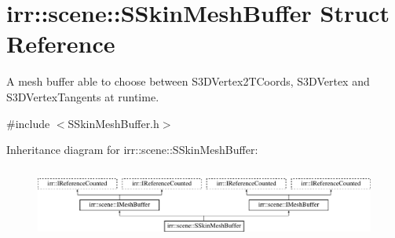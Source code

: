 \hypertarget{structirr_1_1scene_1_1SSkinMeshBuffer}{}\section{irr\+:\+:scene\+:\+:S\+Skin\+Mesh\+Buffer Struct Reference}
\label{structirr_1_1scene_1_1SSkinMeshBuffer}


A mesh buffer able to choose between S3\+D\+Vertex2\+T\+Coords, S3\+D\+Vertex and S3\+D\+Vertex\+Tangents at runtime.  




{\ttfamily \#include $<$S\+Skin\+Mesh\+Buffer.\+h$>$}

Inheritance diagram for irr\+:\+:scene\+:\+:S\+Skin\+Mesh\+Buffer\+:\begin{figure}[H]
\begin{center}
\leavevmode
\includegraphics[height=2.372881cm]{structirr_1_1scene_1_1SSkinMeshBuffer}
\end{center}
\end{figure}
